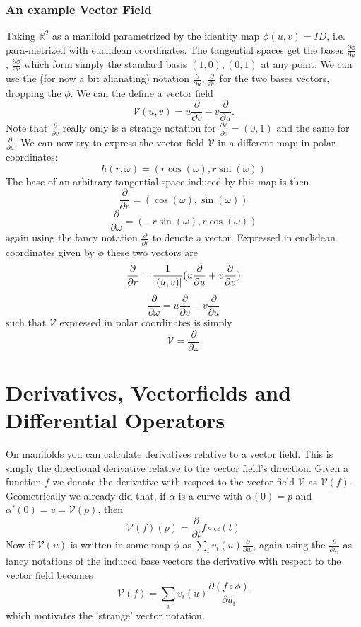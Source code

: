 \subsubsection{An example Vector Field} Taking $\mathbb R^2$ as a manifold parametrized by the identity map $\phi(u,v) = ID$, i.e. para-metrized with euclidean coordinates. The tangential spaces get the bases $\frac{\partial \phi}{\partial u}$ , $\frac{\partial \phi}{\partial v}$ which form simply the standard basis $(1,0), (0,1)$ at any point. We can use the (for now a bit alianating) notation $  \frac{\partial}{\partial u}$, $\frac{\partial}{\partial v}$ for the two bases vectors, dropping the $\phi$. We can the define a vector field
\[\mathcal V(u,v) = u \frac{\partial }{\partial v} - v \frac{\partial }{\partial u}.\]
Note that $\frac{\partial }{\partial v}$ really only is a strange notation for $\frac{\partial \phi}{\partial v} = (0,1)$ and the same for $\frac{\partial }{\partial u}$. We can now try to express the vector field $\mathcal V$ in a different map; in polar coordinates:
\[h(r,\omega) = (r \cos (\omega), r \sin (\omega))\]
The base of an arbitrary tangential space induced by this map is then
\[\frac{\partial}{\partial r} = (\cos(\omega), \sin(\omega)) \]
\[\frac{\partial}{\partial \omega} = (-r \sin(\omega), r\cos(\omega))\]
again using the fancy notation $\frac{\partial}{\partial r}$ to denote a vector. Expressed in euclidean coordinates given by $\phi$ these two vectors are
\[\frac{\partial}{\partial r} = \frac{1}{\left| (u,v) \right|} ( u \frac{\partial }{\partial u} + v \frac{\partial }{\partial v} ) \]
\[\frac{\partial}{\partial \omega} = u \frac{\partial }{\partial v} - v \frac{\partial }{\partial u}\]
such that $\mathcal V$ expressed in polar coordinates is simply
\[\mathcal V = \frac{\partial}{\partial \omega}\]


\section{Derivatives, Vectorfields and Differential Operators}
On manifolds you can calculate derivatives relative to a vector field. This is simply the directional derivative relative to the vector field's direction. Given a function $f$ we denote the derivative with respect to the vector field $\mathcal V$ as $\mathcal V (f)$. Geometrically we already did that, if $\alpha$ is a curve with $\alpha(0) = p$ and $\alpha'(0)= v = \mathcal V (p)$, then
\[\mathcal V (f) (p) = \frac{\partial }{\partial t} f \circ \alpha(t)\]
Now if $\mathcal V(u)$ is written in some map $\phi$ as $\sum_i v_i(u) \frac{\partial}{\partial u_i}$, again using the $\frac{\partial}{\partial u_i}$ as fancy notations of the induced base vectors the derivative with respect to the vector field becomes
\[\mathcal V (f) = \sum_i v_i(u)\frac{\partial(f \circ \phi)}{\partial u_i}\]
which motivates the 'strange' vector notation. 

